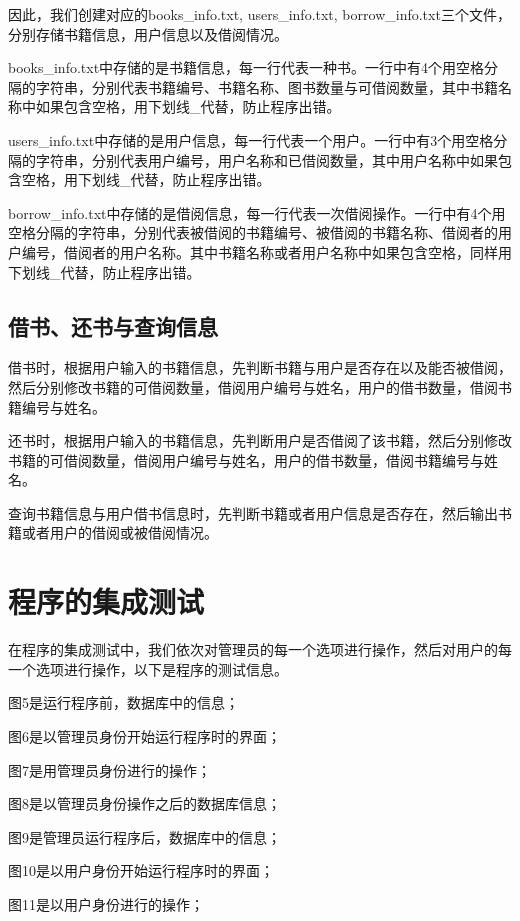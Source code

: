 \documentclass{ctexart}
\begin{document}
    因此，我们创建对应的books\_info.txt, users\_info.txt, borrow\_info.txt三个文件，分别存储书籍信息，用户信息以及借阅情况。
    
    books\_info.txt中存储的是书籍信息，每一行代表一种书。一行中有4个用空格分隔的字符串，分别代表书籍编号、书籍名称、图书数量与可借阅数量，其中书籍名称中如果包含空格，用下划线\_代替，防止程序出错。
    
    users\_info.txt中存储的是用户信息，每一行代表一个用户。一行中有3个用空格分隔的字符串，分别代表用户编号，用户名称和已借阅数量，其中用户名称中如果包含空格，用下划线\_代替，防止程序出错。
    
    borrow\_info.txt中存储的是借阅信息，每一行代表一次借阅操作。一行中有4个用空格分隔的字符串，分别代表被借阅的书籍编号、被借阅的书籍名称、借阅者的用户编号，借阅者的用户名称。其中书籍名称或者用户名称中如果包含空格，同样用下划线\_代替，防止程序出错。
    
    
    \subsection{借书、还书与查询信息}
    借书时，根据用户输入的书籍信息，先判断书籍与用户是否存在以及能否被借阅，然后分别修改书籍的可借阅数量，借阅用户编号与姓名，用户的借书数量，借阅书籍编号与姓名。
    
    还书时，根据用户输入的书籍信息，先判断用户是否借阅了该书籍，然后分别修改书籍的可借阅数量，借阅用户编号与姓名，用户的借书数量，借阅书籍编号与姓名。
    
    查询书籍信息与用户借书信息时，先判断书籍或者用户信息是否存在，然后输出书籍或者用户的借阅或被借阅情况。
    
    
    \section{程序的集成测试}
    在程序的集成测试中，我们依次对管理员的每一个选项进行操作，然后对用户的每一个选项进行操作，以下是程序的测试信息。
    
    图5是运行程序前，数据库中的信息；
    
    图6是以管理员身份开始运行程序时的界面；
    
    图7是用管理员身份进行的操作；
    
    图8是以管理员身份操作之后的数据库信息；
    
    图9是管理员运行程序后，数据库中的信息；
    
    图10是以用户身份开始运行程序时的界面；
    
    图11是以用户身份进行的操作；
    
\end{document}
